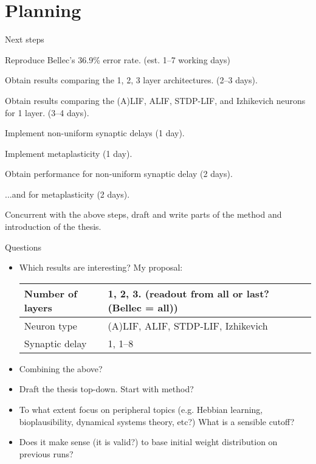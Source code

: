 \documentclass[t]{beamer}
\begin{document}
\section{Planning}
\begin{frame}{Next steps}
  \begin{todolist}

    \item Reproduce Bellec's 36.9\% error rate. (est. 1--7 working days)
    \item Obtain results comparing the 1, 2, 3 layer architectures. (2--3 days).
    \item Obtain results comparing the (A)LIF, ALIF, STDP-LIF, and Izhikevich neurons for 1 layer. (3--4 days).
    \item Implement non-uniform synaptic delays (1 day).
    \item Implement metaplasticity (1 day).
    \item Obtain performance for non-uniform synaptic delay (2 days).
    \item ...and for metaplasticity (2 days).
    \item Concurrent with the above steps, draft and write parts of the method and introduction of the thesis.
  \end{todolist}

\end{frame}
\begin{frame}{Questions}
  \begin{itemize}[label=--]

    \item Which results are interesting? My proposal:
    \begin{tabular}{|l|l|l|}
    \hline
	Number of layers & 1, 2, 3.  (readout from all or last? (Bellec = all))\\
	\hline
	Neuron type & (A)LIF, ALIF, STDP-LIF, Izhikevich\\
	\hline
	Synaptic delay & 1, 1--8\\
	\hline
	\end{tabular}
	\item Combining the above?
	\item Draft the thesis top-down. Start with method?
	\item To what extent focus on peripheral topics (e.g. Hebbian learning, bioplausibility, dynamical systems theory, etc?) What is a sensible cutoff?
	\item Does it make sense (it is valid?) to base initial weight distribution on previous runs?
  \end{itemize}

\end{frame}
\end{document}
